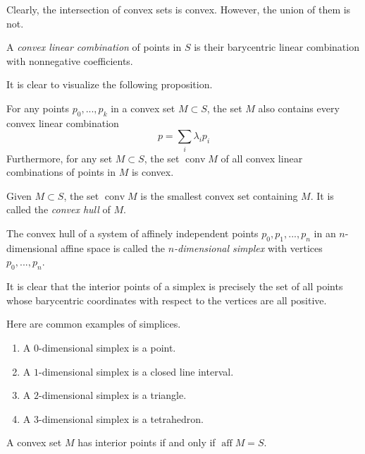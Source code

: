 \documentclass{article}
\DeclareMathOperator{\conv}{conv}
\DeclareMathOperator{\aff}{aff}
\begin{document}
    Clearly, the intersection of convex sets is convex. However, the union of them is not. 

    \begin{definition}
    A \textit{convex linear combination} of points in $S$ is their barycentric linear combination with nonnegative coefficients. 
    \end{definition}

    It is clear to visualize the following proposition. 

    \begin{proposition}
    For any points $p_0, ..., p_k$ in a convex set $M \subset S$, the set $M$ also contains every convex linear combination 
    \[p = \sum_i \lambda_i p_i\]
    Furthermore, for any set $M \subset S$, the set $\conv{M}$ of all convex linear combinations of points in $M$ is convex. 
    \end{proposition}

    \begin{definition}
    Given $M \subset S$, the set $\conv M$ is the smallest convex set containing $M$. It is called the \textit{convex hull} of $M$. 
    \end{definition}

    \begin{definition}
    The convex hull of a system of affinely independent points $p_0, p_1, ..., p_n$ in an $n$-dimensional affine space is called the \textit{$n$-dimensional simplex} with vertices $p_0, ..., p_n$. 
    \end{definition}

    It is clear that the interior points of a simplex is precisely the set of all points whose barycentric coordinates with respect to the vertices are all positive. 

    \begin{example}
    Here are common examples of simplices.
    \begin{enumerate}
        \item A $0$-dimensional simplex is a point. 
        \item A $1$-dimensional simplex is a closed line interval. 
        \item A $2$-dimensional simplex is a triangle. 
        \item A $3$-dimensional simplex is a tetrahedron. 
    \end{enumerate}
    \end{example}

    \begin{proposition}
    A convex set $M$ has interior points if and only if $\aff M = S$. 
    \end{proposition}
\end{document}
